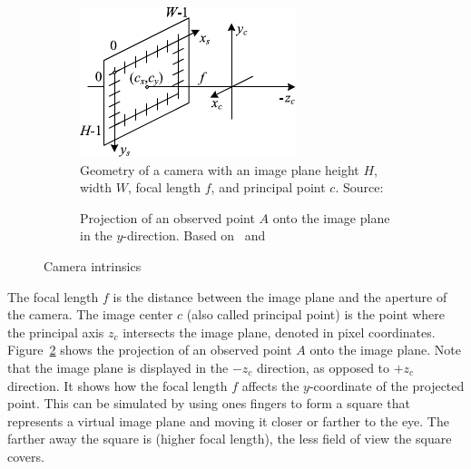 \begin{figure}[ht!]
    \centering
    \begin{subfigure}[t]{0.45\textwidth} %
        \includegraphics[width=1\linewidth]{images/intrinsics}
        \caption{Geometry of a camera with an image plane height $H$, width $W$, focal length $f$, and principal point $c$. Source: \cite{szeliski_computer_2022}}
        \label{fig:intrinsics-3d}
    \end{subfigure}%
    \hspace{0.05\textwidth} %
    \begin{subfigure}[t]{0.45\textwidth} %
        \resizebox{\linewidth}{!}{
            
        }
        \caption{Projection of an observed point $A$ onto the image plane in the $y$-direction. Based on~\cite{kris_kitani_computer_2017} and~\cite{google_llc_arcore_doc}}
        \label{fig:intrinsics-2d}
    \end{subfigure}%
    \caption{Camera intrinsics}
    \label{fig:intrinsics}
\end{figure}

The focal length $f$ is the distance between the image plane and the aperture of the camera.
The image center $c$ (also called principal point) is the point where the principal axis $z_c$
intersects the image plane, denoted in pixel coordinates.
Figure~\ref{fig:intrinsics-2d} shows the projection of an observed point $A$ onto the image plane.
Note that the image plane is displayed in the $-z_c$ direction, as opposed to $+z_c$ direction.
It shows how the focal length $f$ affects the $y$-coordinate of the projected point.
\cite{szeliski_computer_2022, google_llc_arcore_doc, kris_kitani_computer_2017}
This can be simulated by using ones fingers to form a square that represents a virtual
image plane and moving it closer or farther to the eye.
The farther away the square is (higher focal length), the less field of view the square covers.

